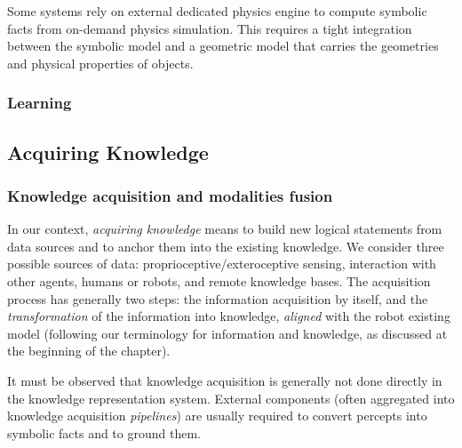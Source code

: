 Some systems \cite{Kunze2011a} rely on external dedicated physics engine to
compute symbolic facts from on-demand physics simulation. This requires a tight
integration between the symbolic model and a geometric model that carries the
geometries and physical properties of objects.

\subsubsection{Learning}
\label{sect|learning}


\subsection{Acquiring Knowledge}

\begin{scriptsize}
\begin{center}
\end{center}
\end{scriptsize}

\subsubsection{Knowledge acquisition and modalities fusion}
\label{sect|knowledge-acquisition}

In our context, \emph{acquiring knowledge} means to build new logical
statements from data sources and to anchor them into the existing knowledge. We
consider three possible sources of data: proprioceptive/exteroceptive sensing,
interaction with other agents, humans or robots, and remote knowledge bases.
The acquisition process has generally two steps: the information acquisition by
itself, and the \emph{transformation} of the information into knowledge,
\emph{aligned} with the robot existing model (following our terminology for
information and knowledge, as discussed at the beginning of the chapter).

It must be observed that knowledge acquisition is generally not done directly
in the knowledge representation system. External components (often aggregated
into knowledge acquisition \emph{pipelines}) are usually required to convert
percepts into symbolic facts and to ground them.

